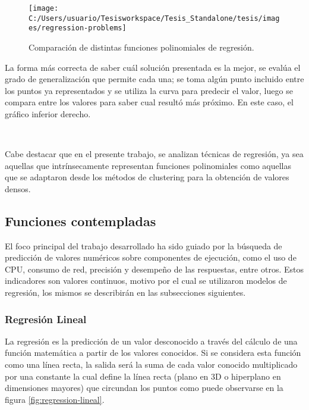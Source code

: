 \begin{figure}
\begin{centering}
\texttt{[image: C:/Users/usuario/Tesisworkspace/Tesis\_Standalone/tesis/images/regression-problems]}
\par\end{centering}

\caption{Comparación de distintas funciones polinomiales de regresión. \label{fig:regression-problems}}
\end{figure}


La forma más correcta de saber cuál solución presentada es la mejor,
se evalúa el grado de generalización que permite cada una; se toma
algún punto incluido entre los puntos ya representados y se utiliza
la curva para predecir el valor, luego se compara entre los valores
para saber cual resultó más próximo. En este caso, el gráfico inferior
derecho. 

~

Cabe destacar que en el presente trabajo, se analizan técnicas de
regresión, ya sea aquellas que intrínsecamente representan funciones
polinomiales como aquellas que se adaptaron desde los métodos de clustering
para la obtención de valores densos.


\subsection{Funciones contempladas\label{subsec:Funciones-contempladas}}

El foco principal del trabajo desarrollado ha sido guiado por la búsqueda
de predicción de valores numéricos sobre componentes de ejecución,
como el uso de CPU, consumo de red, precisión y desempeño de las respuestas,
entre otros. Estos indicadores son valores continuos, motivo por el
cual se utilizaron modelos de regresión, los mismos se describirán
en las subsecciones siguientes. 


\subsubsection{Regresión Lineal\label{sub:Regresi=0000F3n-Lineal}}

La regresión es la predicción de un valor desconocido a través del
cálculo de una función matemática a partir de los valores conocidos.
Si se considera esta función como una línea recta, la salida será
la suma de cada valor conocido multiplicado por una constante la cual
define la línea recta (plano en 3D o hiperplano en dimensiones mayores)
que circundan los puntos como puede observarse en la figura \ref{fig:regression-lineal}. 

